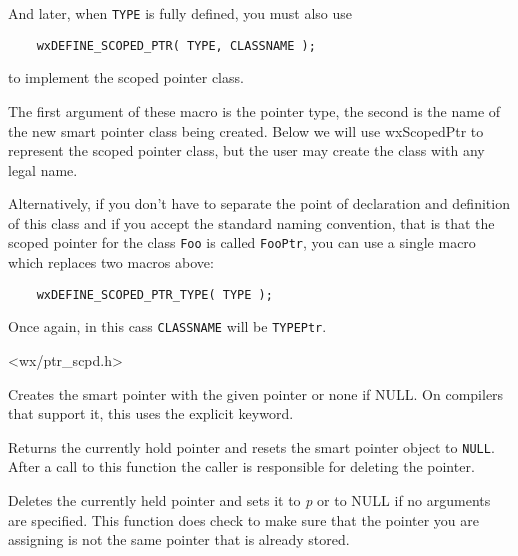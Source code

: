 And later, when \texttt{TYPE} is fully defined, you must also use
\begin{verbatim}
    wxDEFINE_SCOPED_PTR( TYPE, CLASSNAME );
\end{verbatim}
to implement the scoped pointer class.

The first argument of these macro is the pointer type, the second is the name
of the new smart pointer class being created.  Below we will use wxScopedPtr to
represent the scoped pointer class, but the user may create the class with any
legal name.

Alternatively, if you don't have to separate the point of declaration and
definition of this class and if you accept the standard naming convention, that
is that the scoped pointer for the class \texttt{Foo} is called 
\texttt{FooPtr}, you can use a single macro which replaces two macros above:
\begin{verbatim}
    wxDEFINE_SCOPED_PTR_TYPE( TYPE );
\end{verbatim}
Once again, in this cass \texttt{CLASSNAME} will be \texttt{TYPEPtr}.


<wx/ptr\_scpd.h>


\rtfsp




Creates the smart pointer with the given pointer or none if NULL.  On
compilers that support it, this uses the explicit keyword.



Returns the currently hold pointer and resets the smart pointer object to 
{\tt NULL}. After a call to this function the caller is responsible for
deleting the pointer.




Deletes the currently held pointer and sets it to {\it p} or to NULL if no 
arguments are specified. This function does check to make sure that the
pointer you are assigning is not the same pointer that is already stored.

